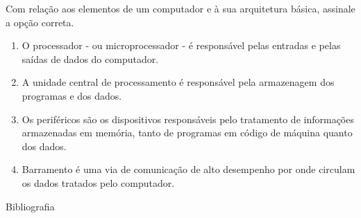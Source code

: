 \documentclass[aspectratio=169,
				xcolor=table]{beamer}
\begin{document}
	\begin{frame}
		Com relação aos elementos de um computador e à sua arquitetura básica, assinale a opção correta.

		\vspace{1em}
		\begin{enumerate}[a]
			\normalsize
			\item O processador - ou microprocessador - é responsável pelas entradas e pelas saídas de dados do computador.
			\item A unidade central de processamento é responsável pela armazenagem dos programas e dos dados.
			\item Os periféricos são os dispositivos responsáveis pelo tratamento de informações armazenadas em memória, tanto de programas em código de máquina quanto dos dados.
			\item Barramento é uma via de comunicação de alto desempenho por onde circulam os dados tratados pelo computador.
		\end{enumerate}

	\end{frame}
	
	\begin{frame}{Bibliografia}
		\nocite{Englander2011}
		\nocite{Paixao2014}
		\nocite{Stallings2010}
    	
    	   	
	
	\end{frame}
		
	\begin{frame}{}
	\end{frame}
\end{document}
